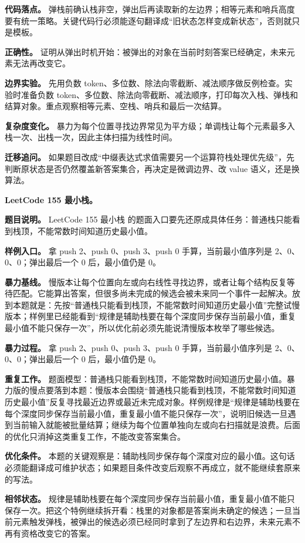 \textbf{代码落点。} 弹栈前确认栈非空，弹出后再读取新的左边界；相等元素和哨兵高度要有统一策略。关键代码行必须能逐句翻译成“旧状态怎样变成新状态”，否则就只是模板。

\textbf{正确性。} 证明从弹出时机开始：被弹出的对象在当前时刻答案已经确定，未来元素无法再改变它。

\textbf{边界实验。} 先用负数 token、多位数、除法向零截断、减法顺序做反例检查。实验时准备负数 token、多位数、除法向零截断、减法顺序，打印每次入栈、弹栈和结算对象。重点观察相等元素、空栈、哨兵和最后一次结算。

\textbf{复杂度变化。} 暴力为每个位置寻找边界常见为平方级；单调栈让每个元素最多入栈一次、出栈一次，因此主体扫描为线性时间。

\textbf{迁移追问。} 如果题目改成“中缀表达式求值需要另一个运算符栈处理优先级”，先判断原状态是否仍然覆盖新答案集合，再决定是微调边界、改 value 语义，还是换算法。

\noindent\textbf{LeetCode 155 最小栈。}

\textbf{题目说明。} LeetCode 155 最小栈 的题面入口要先还原成具体任务：普通栈只能看到栈顶，不能常数时间知道历史最小值。

\textbf{样例入口。} 拿 push 2、push 0、push 3、push 0 手算，当前最小值序列是 2、0、0、0；弹出最后一个 0 后，最小值仍是 0。

\textbf{暴力基线。} 慢版本让每个位置向左或向右线性寻找边界，或者让每个结构反复等待匹配。它能算出答案，但很多尚未完成的候选会被未来同一个事件一起解决。放到本题就是：先按“普通栈只能看到栈顶，不能常数时间知道历史最小值”完整试慢版本；样例里已经能看到“规律是辅助栈要在每个深度同步保存当前最小值，重复最小值不能只保存一次”，所以优化前必须先能说清慢版本枚举了哪些候选。

\textbf{暴力过程。} 拿 push 2、push 0、push 3、push 0 手算，当前最小值序列是 2、0、0、0；弹出最后一个 0 后，最小值仍是 0。

\textbf{重复工作。} 题面模型：普通栈只能看到栈顶，不能常数时间知道历史最小值。暴力版的慢点要落到本题：慢版本会围绕“普通栈只能看到栈顶，不能常数时间知道历史最小值”反复寻找最近边界或最近未完成对象。样例规律是“规律是辅助栈要在每个深度同步保存当前最小值，重复最小值不能只保存一次”，说明旧候选一旦遇到当前输入就能被批量结算；继续为每个位置单独向左或向右扫描就是浪费。后面的优化只消掉这类重复工作，不能改变答案集合。

\textbf{优化条件。} 本题的关键观察是：辅助栈同步保存每个深度对应的最小值。这句话必须能翻译成可维护状态；如果题目条件改变后观察不再成立，就不能继续套原来的写法。

\textbf{相邻状态。} 规律是辅助栈要在每个深度同步保存当前最小值，重复最小值不能只保存一次。把这个特例继续拆开看：栈里的对象都是答案尚未确定的候选；一旦当前元素触发弹栈，被弹出的候选必须已经同时拿到了左边界和右边界，未来元素不再有资格改变它的答案。

